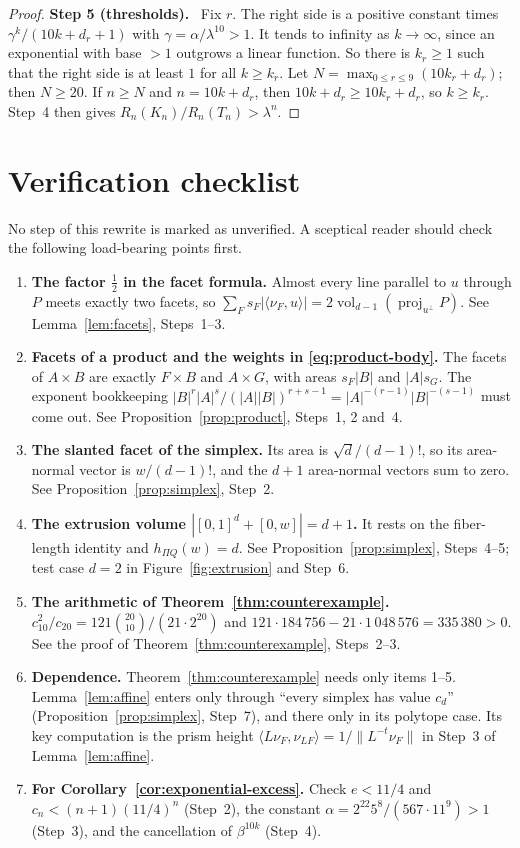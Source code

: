 \documentclass[11pt]{article}
\DeclareMathOperator{\vol}{vol}
\DeclareMathOperator{\proj}{proj}
\newcommand{\step}[1]{\par\smallskip\noindent\textbf{#1}\ }
\begin{document}
\begin{proof}
\step{Step 5 (thresholds).} Fix \(r\). The right side is a positive
constant times \(\gamma^k/(10k+d_r+1)\) with
\(\gamma=\alpha/\lambda^{10}>1\). It tends to infinity as \(k\to\infty\),
since an exponential with base \(>1\) outgrows a linear function. So there
is \(k_r\ge1\) such that the right side is at least \(1\) for all
\(k\ge k_r\). Let \(N=\max_{0\le r\le9}(10k_r+d_r)\); then \(N\ge20\). If
\(n\ge N\) and \(n=10k+d_r\), then \(10k+d_r\ge10k_r+d_r\), so
\(k\ge k_r\). Step~4 then gives \(R_n(K_n)/R_n(T_n)>\lambda^n\).
\end{proof}

\section*{Verification checklist}

No step of this rewrite is marked as unverified. A sceptical reader should
check the following load-bearing points first.
\begin{enumerate}[leftmargin=2em,itemsep=3pt]
\item \textbf{The factor \(\tfrac12\) in the facet formula.} Almost every
 line parallel to \(u\) through \(P\) meets exactly two facets, so
 \(\sum_Fs_F|\langle\nu_F,u\rangle|=2\vol_{d-1}(\proj_{u^\perp}P)\).
 See Lemma~\ref{lem:facets}, Steps~1--3.
\item \textbf{Facets of a product and the weights in
 \eqref{eq:product-body}.} The facets of \(A\times B\) are exactly
 \(F\times B\) and \(A\times G\), with areas \(s_F|B|\) and \(|A|s_G\).
 The exponent bookkeeping
 \(|B|^r|A|^s/(|A||B|)^{r+s-1}=|A|^{-(r-1)}|B|^{-(s-1)}\) must come out.
 See Proposition~\ref{prop:product}, Steps~1, 2 and~4.
\item \textbf{The slanted facet of the simplex.} Its area is
 \(\sqrt d/(d-1)!\), so its area-normal vector is \(w/(d-1)!\), and the
 \(d+1\) area-normal vectors sum to zero. See
 Proposition~\ref{prop:simplex}, Step~2.
\item \textbf{The extrusion volume \(|[0,1]^d+[0,w]|=d+1\).} It rests on
 the fiber-length identity and \(h_{\Pi Q}(w)=d\). See
 Proposition~\ref{prop:simplex}, Steps~4--5; test case \(d=2\) in
 Figure~\ref{fig:extrusion} and Step~6.
\item \textbf{The arithmetic of Theorem~\ref{thm:counterexample}.}
 \(c_{10}^2/c_{20}=121\binom{20}{10}/(21\cdot2^{20})\) and
 \(121\cdot184\,756-21\cdot1\,048\,576=335\,380>0\). See the proof of
 Theorem~\ref{thm:counterexample}, Steps~2--3.
\item \textbf{Dependence.} Theorem~\ref{thm:counterexample} needs only
 items 1--5. Lemma~\ref{lem:affine} enters only through ``every simplex
 has value \(c_d\)'' (Proposition~\ref{prop:simplex}, Step~7), and there
 only in its polytope case. Its key computation is the prism height
 \(\langle L\nu_F,\nu_{LF}\rangle=1/\|L^{-t}\nu_F\|\) in Step~3 of
 Lemma~\ref{lem:affine}.
\item \textbf{For Corollary~\ref{cor:exponential-excess}.} Check
 \(e<11/4\) and \(c_n<(n+1)(11/4)^n\) (Step~2), the constant
 \(\alpha=2^{22}5^8/(567\cdot11^9)>1\) (Step~3), and the cancellation of
 \(\beta^{10k}\) (Step~4).
\end{enumerate}
\end{document}
